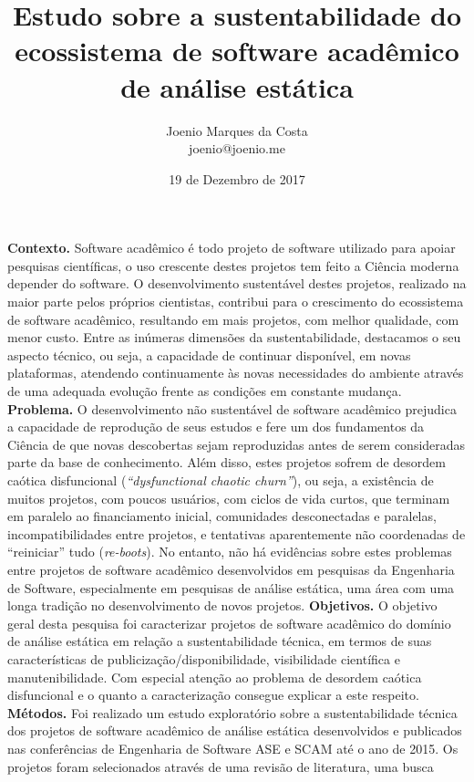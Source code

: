 \documentclass[msc, classic, a4paper]{ufbathesis}
\date{19 de Dezembro de 2017}
\title{
  Estudo sobre a sustentabilidade do ecossistema de software acadêmico de
  análise estática
}
\author{Joenio Marques da Costa\\
  {\small joenio@joenio.me}
}
\begin{document}
\frontpage
\frontmatter
\presentationpage

\resumo

\textbf{Contexto.} 
Software acadêmico é todo projeto de software utilizado para apoiar pesquisas
científicas, o uso crescente destes projetos tem feito a Ciência moderna
depender do software. O desenvolvimento sustentável destes projetos,
realizado na maior parte pelos próprios cientistas, contribui para o
crescimento do ecossistema de software acadêmico, resultando em mais projetos, com melhor
qualidade, com menor custo.
%
Entre as inúmeras dimensões da sustentabilidade, destacamos o seu aspecto
técnico, ou seja, a capacidade de continuar disponível, em novas plataformas,
atendendo continuamente às novas necessidades do ambiente através de uma
adequada evolução frente as condições em constante mudança.
\textbf{Problema.} 
O desenvolvimento não sustentável de software acadêmico prejudica a capacidade
de reprodução de seus estudos e fere um dos fundamentos da Ciência de que novas
descobertas sejam reproduzidas antes de serem consideradas parte da base de
conhecimento.
Além disso, estes projetos sofrem de desordem caótica disfuncional ({\it ``dysfunctional
chaotic churn''}), ou seja, a existência de muitos projetos, com poucos
usuários, com ciclos de vida curtos, que terminam em paralelo ao financiamento
inicial, comunidades desconectadas e paralelas, incompatibilidades entre
projetos, e tentativas aparentemente não coordenadas de ``reiniciar'' tudo
({\it re-boots}).
No entanto, não há evidências sobre estes problemas entre projetos de software
acadêmico desenvolvidos em pesquisas da Engenharia de Software, especialmente
em pesquisas de análise estática, uma área com uma longa tradição no
desenvolvimento de novos projetos.
\textbf{Objetivos.}
O objetivo geral desta pesquisa foi caracterizar projetos de software acadêmico
do domínio de análise estática em relação a sustentabilidade técnica, em termos
de suas características de publicização/disponibilidade, visibilidade
científica e manutenibilidade.
Com especial atenção ao problema de desordem caótica disfuncional
e o quanto a caracterização consegue explicar a este respeito.
\textbf{Métodos.}
Foi realizado um estudo exploratório sobre a sustentabilidade
técnica dos projetos de software acadêmico de análise estática desenvolvidos e
publicados nas conferências de Engenharia de Software ASE e SCAM até o ano de
2015.
%
Os projetos foram selecionados através de uma revisão de literatura, uma busca
\end{document}
